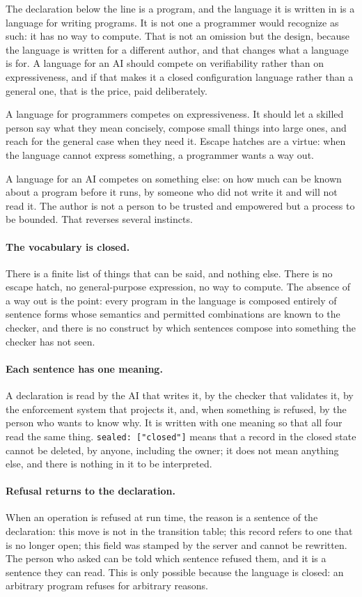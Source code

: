 \documentclass[11pt]{article}
\begin{document}
The declaration below the line is a program, and the language it is written in is a language for writing programs. It is not one a programmer would recognize as such: it has no way to compute. That is not an omission but the design, because the language is written for a different author, and that changes what a language is for. A language for an AI should compete on verifiability rather than on expressiveness, and if that makes it a closed configuration language rather than a general one, that is the price, paid deliberately.

A language for programmers competes on expressiveness. It should let a skilled person say what they mean concisely, compose small things into large ones, and reach for the general case when they need it. Escape hatches are a virtue: when the language cannot express something, a programmer wants a way out.

A language for an AI competes on something else: on how much can be known about a program before it runs, by someone who did not write it and will not read it. The author is not a person to be trusted and empowered but a process to be bounded. That reverses several instincts.

\paragraph{The vocabulary is closed.} There is a finite list of things that can be said, and nothing else. There is no escape hatch, no general-purpose expression, no way to compute. The absence of a way out is the point: every program in the language is composed entirely of sentence forms whose semantics and permitted combinations are known to the checker, and there is no construct by which sentences compose into something the checker has not seen.

\paragraph{Each sentence has one meaning.} A declaration is read by the AI that writes it, by the checker that validates it, by the enforcement system that projects it, and, when something is refused, by the person who wants to know why. It is written with one meaning so that all four read the same thing. \texttt{sealed: ["closed"]} means that a record in the closed state cannot be deleted, by anyone, including the owner; it does not mean anything else, and there is nothing in it to be interpreted.

\paragraph{Refusal returns to the declaration.} When an operation is refused at run time, the reason is a sentence of the declaration: this move is not in the transition table; this record refers to one that is no longer open; this field was stamped by the server and cannot be rewritten. The person who asked can be told which sentence refused them, and it is a sentence they can read. This is only possible because the language is closed: an arbitrary program refuses for arbitrary reasons.
\end{document}
